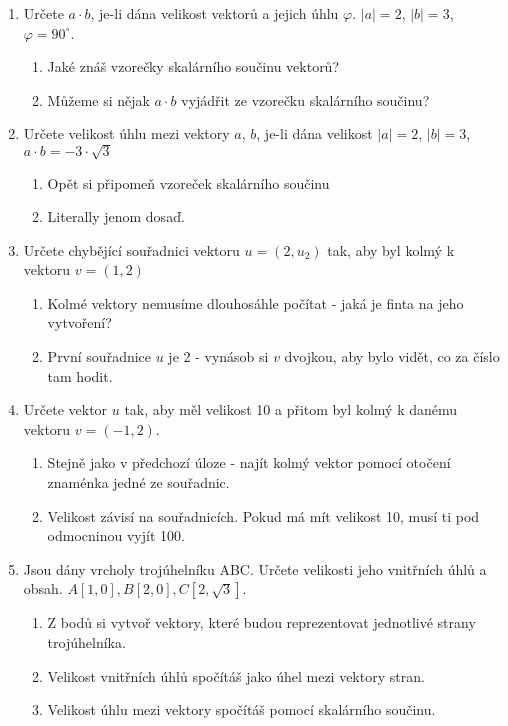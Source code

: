 \documentclass[]{article}
\begin{document}
	\begin{enumerate}
		\item Určete $a \cdot b$, je-li dána velikost vektorů a jejich úhlu $\varphi$. $|a| = 2$, $|b|=3$, $\varphi = 90^\circ$.
		\begin{enumerate}
			\item Jaké znáš vzorečky skalárního součinu vektorů?
			\item Můžeme si nějak $a \cdot b$ vyjádřit ze vzorečku skalárního součinu?
		\end{enumerate}
		\item Určete velikost úhlu mezi vektory $a$, $b$, je-li dána velikost $|a| = 2$, $|b| = 3$, $a \cdot b = -3\cdot\sqrt{3}$ 
		\begin{enumerate}
			\item Opět si připomeň vzoreček skalárního součinu
			\item Literally jenom dosaď.
		\end{enumerate}
		\item Určete chybějící souřadnici vektoru $u = (2, u_2)$ tak, aby byl kolmý k vektoru $v = (1, 2)$
		\begin{enumerate}
			\item Kolmé vektory nemusíme dlouhosáhle počítat - jaká je finta na jeho vytvoření?
			\item První souřadnice $u$ je 2 - vynásob si $v$ dvojkou, aby bylo vidět, co za číslo tam hodit.
		\end{enumerate}
		\item Určete vektor $u$ tak, aby měl velikost 10 a přitom byl kolmý k danému vektoru $v = (-1, 2)$.
		\begin{enumerate}
			\item Stejně jako v předchozí úloze - najít kolmý vektor pomocí otočení znaménka jedné ze souřadnic.
			\item Velikost závisí na souřadnicích. Pokud má mít velikost 10, musí ti pod odmocninou vyjít 100.
		\end{enumerate}		
		\item Jsou dány vrcholy trojúhelníku ABC. Určete velikosti jeho vnitřních úhlů a obsah. $A[1, 0], B[2,0], C[2, \sqrt{3}]$.
		\begin{enumerate}
			\item Z bodů si vytvoř vektory, které budou reprezentovat jednotlivé strany trojúhelníka.
			\item Velikost vnitřních úhlů spočítáš jako úhel mezi vektory stran.
			\item Velikost úhlu mezi vektory spočítáš pomocí skalárního součinu.

\end{enumerate}
\end{enumerate}
\end{document}
